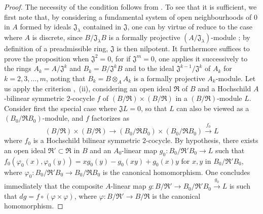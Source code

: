\begin{proof}
The necessity of the condition follows from .
To see that it is sufficient, we first note that, by considering a fundamental system of open neighbourhoods of $0$ in $A$ formed by ideals $\mathfrak{J}_\lambda$ contained in $\mathfrak{J}$, one can by virtue of  reduce to the case where $A$ is discrete, since $B/\mathfrak{J}_\lambda B$ is a formally projective $(A/\mathfrak{J}_\lambda)$-module ;
by definition of a preadmissible ring, $\mathfrak{J}$ is then nilpotent.
It furthermore suffices to prove the proposition when $\mathfrak{J}^2=0$, for if $\mathfrak{J}^m=0$, one applies it successively to the rings $A_k=A/\mathfrak{J}^k$ and $B_k=B/\mathfrak{J}^k B$ and to the ideal $\mathfrak{J}^{k-1}/\mathfrak{J}^k$ of $A_k$ for $k=2,3,\ldots,m$, noting  that $B_k=B\otimes_A A_k$ is a formally projective $A_k$-module.
Let us apply the criterion ,~(ii), considering an open ideal $\mathfrak{R}$ of $B$ and a Hochschild $A$-bilinear symmetric $2$-cocycle $f$ of $(B/\mathfrak{R})\times(B/\mathfrak{R})$ in a $(B/\mathfrak{R})$-module $L$.
Consider first the special case where $\mathfrak{J}L=0$, so that $L$ can also be viewed as a $(B_0/\mathfrak{R}B_0)$-module, and $f$ factorizes as
\[
  (B/\mathfrak{R})\times(B/\mathfrak{R}) \to (B_0/\mathfrak{R}B_0)\times(B_0/\mathfrak{R}B_0) \xrightarrow{f_0} L
\]
where $f_0$ is a Hochschild bilinear symmetric $2$-cocycle.
By hypothesis, there exists an open ideal $\mathfrak{R}'\subset\mathfrak{R}$ in $B$ and an $A_0$-linear map $g_0:B_0/\mathfrak{R}'B_0\to L$ such that $f_0(\varphi_0(x),\varphi_0(y))=xg_0(y)-g_0(xy)+g_0(x)y$ for $x,y$ in $B_0/\mathfrak{R}'B_0$, where $\varphi_0:B_0/\mathfrak{R}'B_0\to B_0/\mathfrak{R}B_0$ is the canonical homomorphism.
One concludes immediately that the composite $A$-linear map $g:B/\mathfrak{R}'\to B_0/\mathfrak{R}'B_0\xrightarrow{g_0}L$ is such that $dg=f\circ(\varphi\times\varphi)$, where $\varphi:B/\mathfrak{R}'\to B/\mathfrak{R}$ is the canonical homomorphism.


\end{proof}

